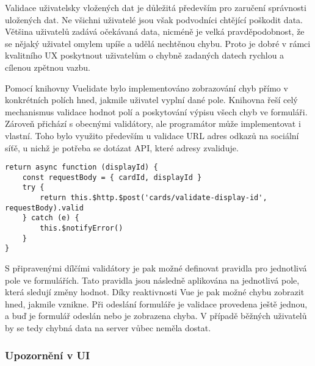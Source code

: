 		Validace uživatelsky vložených dat je důležitá především pro zaručení správnosti uložených dat.
		Ne všichni uživatelé jsou však podvodníci chtějící poškodit data.
		Většina uživatelů zadává očekávaná data, nicméně je velká pravděpodobnost, že se nějaký uživatel omylem upíše
		a udělá nechtěnou chybu.
		Proto je dobré v rámci kvalitního \ac{UX} poskytnout uživatelům o chybně zadaných datech rychlou a cílenou zpětnou vazbu.


		Pomocí knihovny Vuelidate bylo implementováno zobrazování chyb přímo v konkrétních polích hned,
		jakmile uživatel vyplní dané pole.
		Knihovna řeší celý mechanismus validace hodnot polí a poskytování výpisu všech chyb ve formuláři.
		Zároveň přichází s obecnými validátory, ale programátor může implementovat i vlastní.
		Toho bylo využito především u validace \ac{URL} adres odkazů na sociální síťě, u nichž je potřeba se dotázat \ac{API},
		které adresy zvaliduje.

		\begin{lstlisting}[caption={Ukázka implementace vlastního validátoru využívající API k validaci hodnoty. Zdroj: [autor]}]
return async function (displayId) {
	const requestBody = { cardId, displayId }
	try {
		return this.$http.$post('cards/validate-display-id', requestBody).valid
	} catch (e) {
		this.$notifyError()
	}
}
		\end{lstlisting}

%

		S připravenými dílčími validátory je pak možné definovat pravidla pro jednotlivá pole ve formulářích.
		Tato pravidla jsou následně aplikována na jednotlivá pole, která sledují změny hodnot.
		Díky reaktivnosti Vue je pak možné chybu zobrazit hned, jakmile vznikne.
		Při odeslání formuláře je validace provedena ještě jednou, a buď je formulář odeslán nebo je
		zobrazena chyba.
		V případě běžných uživatelů by se tedy chybná data na server vůbec neměla dostat.

		\subsubsection{Upozornění v UI}

